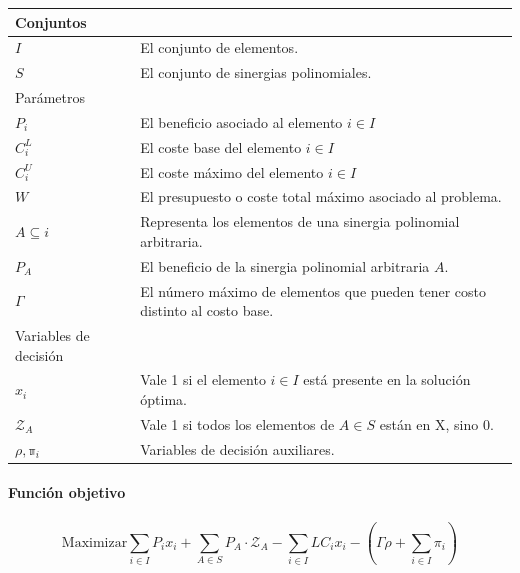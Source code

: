 \documentclass[spanish, a4paper, 12pt, openany,final]{book}
\begin{document}
 \begingroup 
 \renewcommand{\arraystretch}{1.4}
  \begin{table}
  \begin{tabular}{l p{11cm}}
  	\hline
  	Conjuntos & \\
  	\hline
  	$I$ & El conjunto de elementos.\\
  	$S$& El conjunto de sinergias polinomiales.\\
  	\hline Parámetros & \\ \hline
  	
  	$P_i$ & El beneficio asociado al elemento $i \in I$ \\
  	$C^L_i$& El coste base del elemento $i \in I$    \\
  	$C^U_i$& El coste máximo del elemento $i \in I$     \\
  	$W$& El presupuesto o coste total máximo asociado al problema.\\
  	$A \subseteq i$& Representa los elementos de una sinergia polinomial arbitraria.\\
  	$P_A$& El beneficio de la sinergia polinomial arbitraria $A$.\\
  	$\Gamma$& El número máximo de elementos que pueden tener costo distinto al costo base.\\
  	
  	\hline Variables de decisión &\\ \hline
  	$x_i$ & Vale 1 si el elemento $i \in I$ está presente en la solución óptima.\\
  	$\mathcal{Z}_A$ & Vale 1 si todos los elementos de $A \in S$ están en X, sino 0.\\
  	$\mathbb{\rho}, \mathbb{\pi}_i$ & Variables de decisión auxiliares. \\
  	
  	
  \end{tabular}
  \end{table} 
  
  \endgroup
    
	\paragraph*{Función objetivo}
	
	
	\begin{equation}
		\label{eq:of}
		\text{Maximizar} \sum_{i\in I}{P_ix_i} + \sum_{A\in S} P_A\cdot \mathcal{Z}_A -
		\sum_{i\in I} {LC_{i}x_i} - \left(\Gamma\rho+\sum_{i \in I} \pi_i\right)
	\end{equation}
\end{document}

